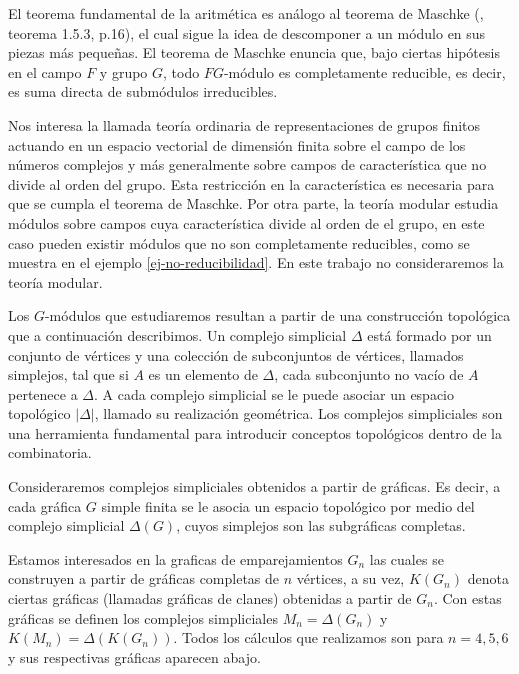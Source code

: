 \documentclass[12pt]{book}
\theoremstyle{definition}
\newcounter{in}
\newcounter{ini}
\begin{document}
El teorema fundamental de la aritmética es análogo al teorema de
Maschke (\cite{sagan2001symmetric}, teorema 1.5.3, p.16), el cual
sigue la idea de descomponer a un módulo en sus piezas más
pequeñas. El teorema de Maschke enuncia que, bajo ciertas hipótesis en
el campo $F$ y grupo $G$, todo $FG$-módulo es completamente reducible,
es decir, es suma directa de submódulos irreducibles.

Nos interesa la llamada teoría ordinaria de representaciones de grupos finitos
actuando en un espacio vectorial de dimensión finita sobre el campo de
los números complejos y más generalmente sobre campos de
característica que no divide al orden del grupo. Esta restricción en
la característica es necesaria para que se cumpla el teorema de Maschke.
Por otra parte, la teoría modular estudia módulos sobre campos cuya
característica divide al orden de el grupo, en este caso pueden
existir módulos que no son completamente reducibles, como se
muestra en el ejemplo \ref{ej-no-reducibilidad}. En este trabajo no consideraremos la teoría
modular.%

Los $G$-módulos que estudiaremos resultan a partir de una construcción
topológica que a continuación describimos. Un complejo simplicial
$\Delta$ está formado por un conjunto de vértices y una colección de
subconjuntos de vértices, llamados simplejos, tal que si $A$ es un
elemento de $\Delta$, cada subconjunto no vacío de $A$ pertenece a
$\Delta$. A cada complejo simplicial se le puede asociar un espacio
topológico $|\Delta|$, llamado su realización geométrica. Los
complejos simpliciales son una herramienta fundamental para introducir
conceptos topológicos dentro de la combinatoria.

Consideraremos complejos simpliciales obtenidos a partir de
gráficas. Es decir, a cada gráfica $G$ simple finita se le asocia un
espacio topológico por medio del complejo simplicial $\Delta(G)$, cuyos
simplejos son las subgráficas completas. 

Estamos interesados en la graficas de emparejamientos $G_{n}$ las
cuales se construyen a partir  de gráficas completas de $n$ vértices,
a su vez, $K(G_{n})$ denota ciertas gráficas (llamadas gráficas de
clanes) obtenidas a partir de
$G_{n}$. Con estas gráficas se definen los complejos simpliciales
$M_{n}=\Delta(G_{n})$ y $K(M_{n})=\Delta(K(G_{n}))$. Todos los cálculos que
realizamos son para $n=4,5,6$ y sus respectivas gráficas aparecen abajo.
\end{document}
